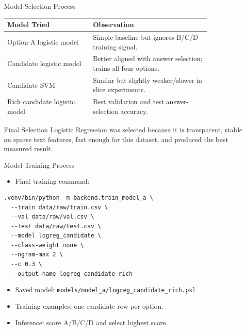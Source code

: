 \documentclass[aspectratio=169,11pt]{beamer}
\begin{document}
\begin{frame}{Model Selection Process}
    \begin{table}
        \centering
        \small
        \begin{tabular}{p{0.35\linewidth} p{0.48\linewidth}}
            \toprule
            \textbf{Model Tried} & \textbf{Observation} \\
            \midrule
            Option-A logistic model & Simple baseline but ignores B/C/D training signal. \\
            Candidate logistic model & Better aligned with answer selection; trains all four options. \\
            Candidate SVM & Similar but slightly weaker/slower in slice experiments. \\
            Rich candidate logistic model & Best validation and test answer-selection accuracy. \\
            \bottomrule
        \end{tabular}
    \end{table}

    \begin{block}{Final Selection}
        Logistic Regression was selected because it is transparent, stable on sparse text
        features, fast enough for this dataset, and produced the best measured result.
    \end{block}
\end{frame}

\begin{frame}[fragile]{Model Training Process}
    \begin{itemize}
        \item Final training command:
    \end{itemize}

    \scriptsize
    \begin{verbatim}
.venv/bin/python -m backend.train_model_a \
  --train data/raw/train.csv \
  --val data/raw/val.csv \
  --test data/raw/test.csv \
  --model logreg_candidate \
  --class-weight none \
  --ngram-max 2 \
  --c 0.3 \
  --output-name logreg_candidate_rich
    \end{verbatim}
    \normalsize

    \begin{itemize}
        \item Saved model: \texttt{models/model\_a/logreg\_candidate\_rich.pkl}
        \item Training examples: one candidate row per option.
        \item Inference: score A/B/C/D and select highest score.
    \end{itemize}
\end{frame}
\end{document}
